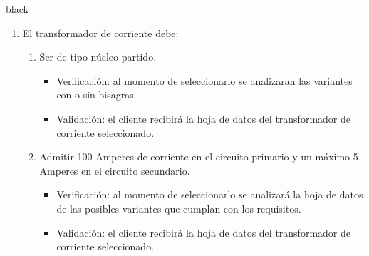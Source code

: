 \documentclass[11pt]{charter}
\begin{document}
\begin{consigna}{black}
\begin{enumerate}
\begin{enumerate}[label*=\arabic*.]
			\item El transformador de corriente debe:
			\begin{enumerate}[label*=\arabic*.]
				\item Ser de tipo núcleo partido.
					\begin{itemize}
						\item Verificación: al momento de seleccionarlo se analizaran las variantes con o sin bisagras.\\
						\item Validación: el cliente recibirá la hoja de datos del transformador de corriente seleccionado.\\
					\end{itemize}
				\item Admitir 100 Amperes de corriente en el circuito primario y un máximo 5 Amperes en el circuito secundario.
					\begin{itemize}
						\item Verificación: al momento de seleccionarlo se analizará la hoja de datos de las posibles variantes que cumplan con los requisitos.\\
						\item Validación: el cliente recibirá la hoja de datos del transformador de corriente seleccionado.\\
					\end{itemize}
			\end{enumerate}
			

\end{enumerate}
\end{enumerate}
\end{consigna}
\end{document}

